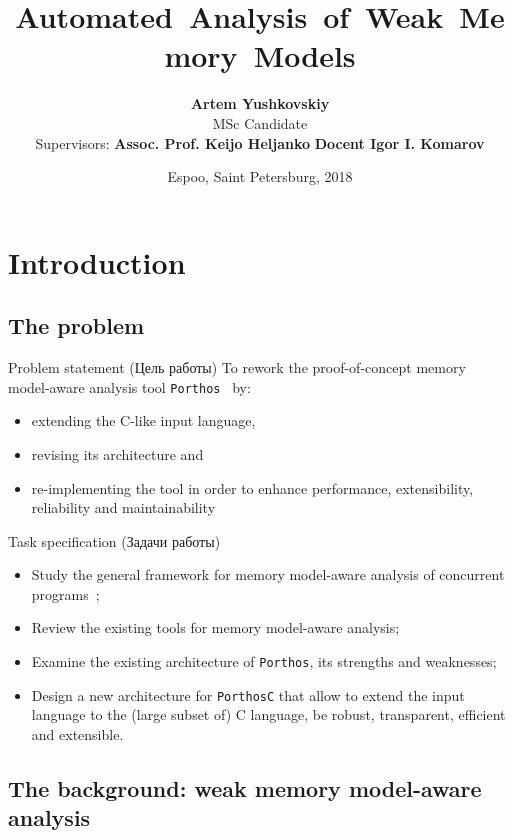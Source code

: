 \documentclass{beamer}
\title{\nohyphens{\textbf{Automated~Analysis~of~Weak~Memory~Models}}}
\author{\textbf{Artem Yushkovskiy}\inst{1,2} \\ 
{\scriptsize MSc Candidate}
\\ \vspace{1em}
{\footnotesize\raggedleft Supervisors: \textbf{Assoc. Prof. Keijo Heljanko}\inst{1} \newline
\hphantom{Supervis} \textbf{Docent Igor I. Komarov}\inst{2} }
}%
\institute %
{
  \inst{1}%
  Department of Computer Science, \\
  School of Science, \\
  \textbf{Aalto University} (Espoo, Finland)%
  \and
  \inst{2}%
  Faculty of Information Security \\
  and Computer Technologies, \\
  \textbf{ITMO University} (Saint Petersburg, Russia)%
}
\date{\scriptsize Espoo, Saint Petersburg, 2018}
\begin{document}
\begin{frame}
  \titlepage
\end{frame}





\section{Introduction}

\subsection{The problem}


\begin{frame}{Problem statement (Цель работы)}
To rework the proof-of-concept memory model-aware analysis tool \texttt{Porthos}~\cite{Porthos17a} by:
\begin{itemize}
\item extending the C-like input language,
\item revising its architecture and
\item re-implementing the tool in order to enhance performance, extensibility, reliability and maintainability
\end{itemize}
\end{frame}


\begin{frame}{Task specification (Задачи работы)}
\begin{itemize}
\item Study the general framework for memory model-aware analysis of concurrent programs~\cite{alglave2010shared};
\item Review the existing tools for memory model-aware analysis;
\item Examine the existing architecture of \texttt{Porthos}, its strengths and weaknesses;
\item Design a new architecture for \texttt{PorthosC} that allow to extend the input language to the (large subset of) C language, be robust, transparent, efficient and extensible.
\end{itemize}
\end{frame}


\subsection{The background: weak memory model-aware analysis}
\end{document}
